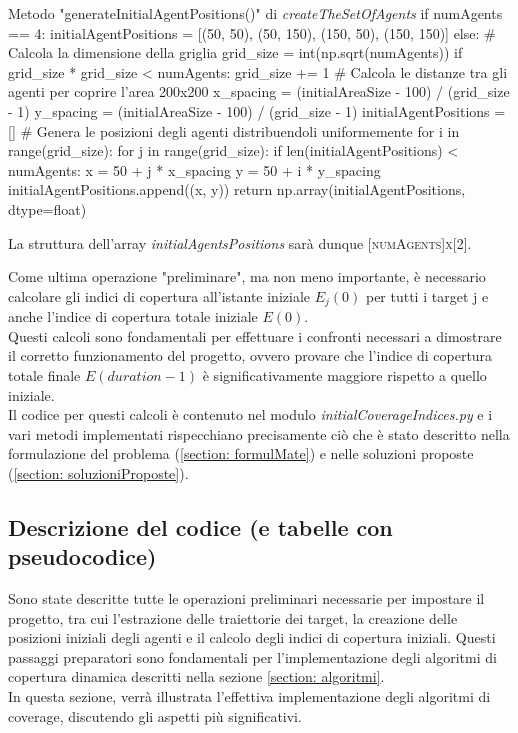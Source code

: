 \documentclass[twoside]{article}
\begin{document}
\begin{code}{Metodo "generateInitialAgentPositions()" di \textit{createTheSetOfAgents}}
if numAgents == 4:
        initialAgentPositions = [(50, 50), (50, 150), (150, 50), (150, 150)]
    else:
        # Calcola la dimensione della griglia
        grid_size = int(np.sqrt(numAgents))
        if grid_size * grid_size < numAgents:
            grid_size += 1
        # Calcola le distanze tra gli agenti per coprire l'area 200x200
        x_spacing = (initialAreaSize - 100) / (grid_size - 1)
        y_spacing = (initialAreaSize - 100) / (grid_size - 1)
        initialAgentPositions = []
        # Genera le posizioni degli agenti distribuendoli uniformemente
        for i in range(grid_size):
            for j in range(grid_size):
                if len(initialAgentPositions) < numAgents:
                    x = 50 + j * x_spacing
                    y = 50 + i * y_spacing
                    initialAgentPositions.append((x, y))
    return np.array(initialAgentPositions, dtype=float)
\end{code}

La struttura dell'array \textit{initialAgentsPositions} sarà dunque \textsc{[numAgents]x[2]}.

\vspace{\baselineskip}

Come ultima operazione "preliminare", ma non meno importante, è necessario calcolare gli indici di copertura all'istante iniziale $E_j(0)$ per tutti i target j e anche l'indice di copertura totale iniziale $E(0)$.\\
Questi calcoli sono fondamentali per effettuare i confronti necessari a dimostrare il corretto funzionamento del progetto, ovvero provare che l'indice di copertura totale finale $E(duration-1)$ è significativamente maggiore rispetto a quello iniziale.\\
Il codice per questi calcoli è contenuto nel modulo \textit{initialCoverageIndices.py} e i vari metodi implementati rispecchiano precisamente ciò che è stato descritto nella formulazione del problema (\ref{section: formulMate}) e nelle soluzioni proposte (\ref{section: soluzioniProposte}).

\newpage

\subsection{Descrizione del codice (e tabelle con pseudocodice)}\label{section: descrizioneCodice}

Sono state descritte tutte le operazioni preliminari necessarie per impostare il progetto, tra cui l'estrazione delle traiettorie dei target, la creazione delle posizioni iniziali degli agenti e il calcolo degli indici di copertura iniziali. Questi passaggi preparatori sono fondamentali per l'implementazione degli algoritmi di copertura dinamica descritti nella sezione \ref{section: algoritmi}.\\
In questa sezione, verrà illustrata l'effettiva implementazione degli algoritmi di coverage, discutendo gli aspetti più significativi.
\end{document}
